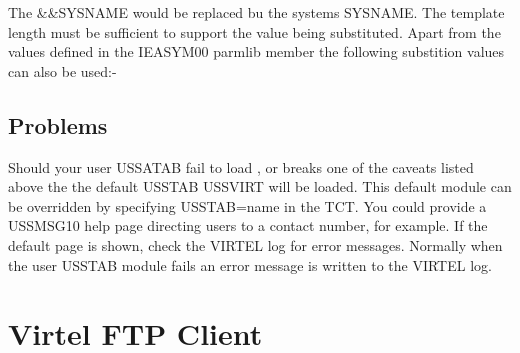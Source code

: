 \documentclass[letterpaper,10pt,english]{sphinxmanual}
\begin{document}
The \&\&SYSNAME would be replaced bu the systems SYSNAME. The template length must be sufficient to support the value being substituted. Apart from the values defined in the IEASYM00 parmlib member the following substition values can also be used:-

\begin{sphinxVerbatim}[commandchars=\\\{\}]
     
                           
                                  
                                  
                                
                                
\end{sphinxVerbatim}


\section{Problems}
\label{\detokenize{Customization:problems}}
Should your user USSATAB fail to load , or breaks one of the caveats listed above the the default USSTAB USSVIRT will be loaded. This default module can be overridden by specifying USSTAB=name in the TCT. You could provide a USSMSG10 help page directing users to a contact number, for example. If the default page is shown, check the VIRTEL log for error messages. Normally when the user USSTAB module fails an error message is written to the VIRTEL log.

\ignorespaces 

\chapter{Virtel FTP Client}
\label{\detokenize{Customization:virtel-ftp-client}}\label{\detokenize{Customization:index-128}}
\end{document}
